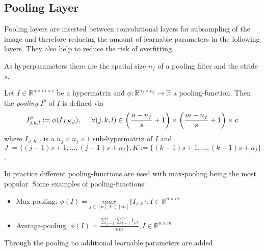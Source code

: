 \documentclass[a4paper, 12pt]{scrreprt} %
\begin{document}


\subsection{Pooling Layer}
\label{subsec:PL}
Pooling layers are inserted between convolutional layers for subsampling of the image and therefore reducing the amount of learnable parameters in the following layers. They also help to reduce the risk of overfitting.

As hyperparameters there are the spatial size $n_f$ of a pooling filter and the stride $s$.

\begin{definition}[Pooling]
Let $I \in \mathbb{R}^{n\times m \times c}$  be a hypermatrix and $\phi : \mathbb{R}^{n_f \times n_f} \to \mathbb{R}$ a pooling-function. Then the \emph{pooling} $I^p$ of $I$ is defined via
\begin{equation*}
I^p_{j,k,l}:=\phi(I_{J,K,l}), \hspace{0.5cm} \forall (j,k,l) \in \left(\frac{n-n_f}{s}+1\right) \times \left(\frac{m-n_f}{s}+1\right) \times c
\end{equation*}
where $I_{J,K,l}$ is a $n_f \times n_f \times 1$ sub-hypermatrix of $I$ and $J:=\{(j-1)s+1,\dots,(j-1)s+n_f\}, K:=\{(k-1)s+1,\dots,(k-1)s+n_f\}$.
\end{definition}


In practice different pooling-functions are used with max-pooling being the most popular. Some examples of pooling-functions:
\begin{itemize}
	\item Max-pooling: $\phi(I) = \underset{j \in [n],k \in [m]}{max}\{I_{j,k}\}, I\in \mathbb{R}^{n\times m}$ 
	\item Average-pooling: $\phi(I) = \frac{\sum\limits_{j=1}^{n}\sum\limits_{k=1}^{m}{I_{j,k}}}{nm}, I\in \mathbb{R}^{n\times m}$
\end{itemize}

Through the pooling no additional learnable parameters are added.
\end{document}
